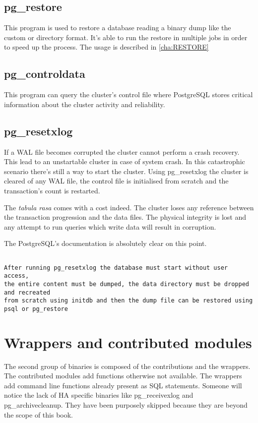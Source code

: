 \subsection{pg\_restore}
This program is used to restore a database reading a binary dump like the custom or directory
format. It's able to run the restore in multiple jobs in order to speed up the process. The usage
is described in \ref{cha:RESTORE}

\subsection{pg\_controldata}\label{sub:PGCONTROLDATA}
This program can query the cluster's control file where PostgreSQL stores critical information about
the cluster activity and reliability.

\subsection{pg\_resetxlog}
If a WAL file becomes corrupted the cluster cannot perform a crash recovery. This lead to an
unstartable cluster in case of system crash. In this catastrophic scenario there's still a
way to start the cluster. Using pg\_resetxlog the cluster is cleared of any WAL file, the
control file is initialised from scratch and the transaction's count is restarted.\newline

The \textit{tabula rasa} comes with a cost indeed. The cluster loses any reference between the
transaction progression and the data files. The physical integrity is lost and any attempt to run
queries which write data will result in corruption.\newline

The PostgreSQL's documentation is absolutely clear on this point.

\begin{verbatim}

After running pg_resetxlog the database must start without user access,
the entire content must be dumped, the data directory must be dropped and recreated
from scratch using initdb and then the dump file can be restored using psql or pg_restore
\end{verbatim}

\section{Wrappers and contributed modules}
The second group of binaries is composed of the contributions and the wrappers. The
contributed modules add functions otherwise not available. The wrappers add command line
functions already present as SQL statements. Someone will notice the lack of HA specific binaries
like pg\_receivexlog and pg\_archivecleanup. They have been purposely skipped because they are beyond the
scope of this book.

